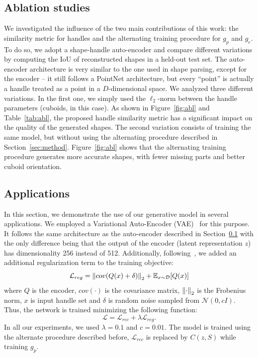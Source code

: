 \subsection{Ablation studies}
\label{sec:ablation}
We investigated the influence of the two main contributions of this work:
the similarity metric for handles and the alternating training procedure for $g_p$ and $g_e$.
To do so, we adopt a shape-handle auto-encoder and compare different variations by computing
the IoU of reconstructed shapes in a held-out test set.
The auto-encoder architecture is very similar to the one used in shape parsing, except for
the encoder -- it still follows a PointNet architecture, but every ``point'' is actually
a handle treated as a point in a $D$-dimensional space.
We analyzed three different variations.
In the first one, we simply used the $\ell_2$-norm between the handle parameters (cuboids, in this case).
As shown in Figure~\ref{fig:abl} and Table~\ref{tab:abl},
the proposed handle similarity metric has a significant impact on the quality of the
generated shapes.
The second variation consists of training the same model, but without using the alternating procedure
described in Section~\ref{sec:method}. %
Figure~\ref{fig:abl} shows that the alternating training procedure generates
more accurate shapes, with fewer missing parts and better cuboid orientation.


\subsection{Applications}
\label{sec:applications}
In this section, we demonstrate the use of our generative model in several applications.
We employed a Variational Auto-Encoder (VAE)~\cite{vae} for this purpose.
It follows the same architecture as the auto-encoder described in Section~\ref{sec:ablation} with the 
only difference being that the output of the encoder (latent representation $z$) has
dimensionality 256 instead of 512.
Additionally, following~\cite{mrt18}, we added an additional regularization term to the training objective:
\begin{equation}
    \mathcal{L}_{reg} = \left\lVert cov(Q(x) + \delta)\right\rVert_2 + \mathbb{E}_{x\sim\mathcal{D}}[Q(x)]
\end{equation}
where $Q$ is the encoder, $cov(\cdot)$ is the covariance matrix, $\left\lVert\cdot\right\rVert_2$ is the Frobenius norm, $x$ is input handle set and $\delta$ is random noise sampled from $\mathcal{N}(0,cI)$.
Thus, the network is trained minimizing the following function:
\begin{equation}
    \mathcal{L} = \mathcal{L}_{rec} + \lambda\mathcal{L}_{reg}.
\end{equation}
In all our experiments, we used $\lambda=0.1$ and $c=0.01$.
The model is trained using the alternate procedure described before, \ie $\mathcal{L}_{rec}$ is replaced by $C(z,S)$ while training $g_p$.

